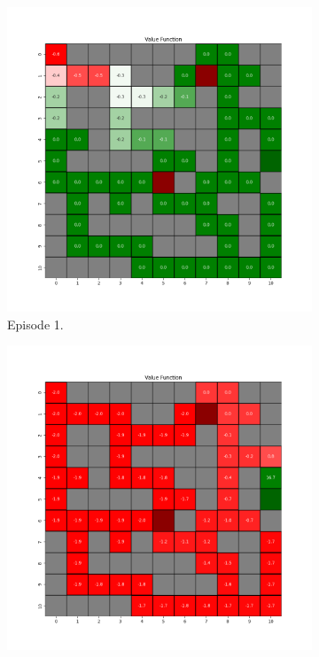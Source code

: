 \documentclass{assignment}
\begin{document}
\begin{figure}[H]
    \begin{subfigure}{0.3\textwidth}
        \includegraphics[width=\textwidth]{figures/value_q/gamma_sweep/value_function_alpha_0.1_gamma_0.5_epsilon_0.2_iteration_1.png}
    \caption{Episode 1.}
    \end{subfigure}\hfill
    \begin{subfigure}{0.3\textwidth}
        \includegraphics[width=\textwidth]{figures/value_q/gamma_sweep/value_function_alpha_0.1_gamma_0.5_epsilon_0.2_iteration_50.png}

\end{subfigure}
\end{figure}
\end{document}
